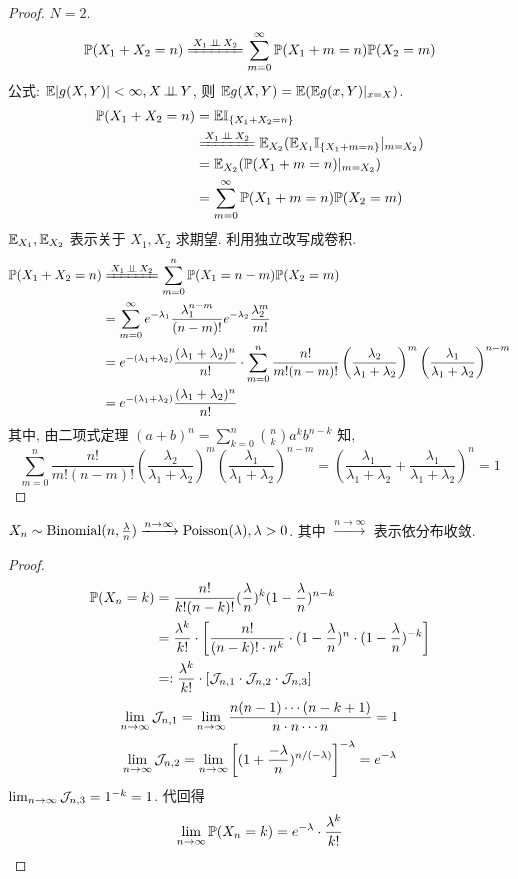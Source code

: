 \begin{proof}
    $N=2$. 
    \[
    \PP(X_1+X_2=n)\xlongequal{X_1\ind X_2}\sum_{m=0}^{\infty}\PP(X_1+m=n)\PP(X_2=m)
    \]
    公式: $\mathbb E |g(X,Y)|<\infty, X\operatorname{\perp\!\!\!\perp} Y$, 则 $\mathbb E g(X,Y)=\mathbb E(\mathbb E g(x,Y)|_{x=X})$.
    \[
    \begin{aligned}
        \PP(X_1+X_2=n) &=\EE \II_{\{X_1+X_2=n\}}\\
        &\xlongequal{X_1\ind X_2}\EE_{X_2}(\EE_{X_1} \II_{\{X_1+m=n\}}|_{m=X_2})\\
        &=\EE_{X_2}(\PP(X_1+m=n)|_{m=X_2})\\
        &=\sum_{m=0}^{\infty}\PP(X_1+m=n)\PP(X_2=m)
    \end{aligned}
    \]
    $\mathbb E_{X_1},\mathbb E_{X_2}$ 表示关于 $X_1,X_2$ 求期望. 利用独立改写成卷积.
    \[
    \begin{aligned}
        \PP(X_1+X_2=n) &\xlongequal{X_1\ind X_2} \sum_{m=0}^n \PP(X_1=n-m)\PP(X_2=m)\\
        &=\sum_{m=0}^{\infty}e^{-\lambda_1}\frac{\lambda_1^{n-m}}{(n-m)!}e^{-\lambda_2}\frac{\lambda_2^m}{m!}\\
        &=e^{-(\lambda_1+\lambda_2)}\frac{(\lambda_1+\lambda_2)^n}{n!}\cdot \sum_{m=0}^n\frac{n!}{m!(n-m)!}\left(\frac{\lambda_2}{\lambda_1+\lambda_2}\right)^m\left(\frac{\lambda_1}{\lambda_1+\lambda_2}\right)^{n-m}\\
        &=e^{-(\lambda_1+\lambda_2)}\frac{(\lambda_1+\lambda_2)^n}{n!}
    \end{aligned}
    \]
其中, 由二项式定理 $(a + b)^n = \sum_{k=0}^{n} \binom{n}{k} a^k b^{n-k}$ 知,
    \[
    \sum_{m=0}^n\frac{n!}{m!(n-m)!}\left(\frac{\lambda_2}{\lambda_1+\lambda_2}\right)^m\left(\frac{\lambda_1}{\lambda_1+\lambda_2}\right)^{n-m}=\left(\frac{\lambda_1}{\lambda_1+\lambda_2}+\frac{\lambda_1}{\lambda_1+\lambda_2}\right)^n=1
    \]
\end{proof}

\begin{theorem}
    $X_n\sim \operatorname{Binomial}(n,\frac{\lambda}{n})\xrightarrow{n\to\infty}\operatorname{Poisson}(\lambda), \lambda>0$. 其中 $\xrightarrow{n\to\infty}$ 表示依分布收敛.
\end{theorem}

\begin{proof}
\[
\begin{aligned}
    \mathbb{P}(X_n=k) &=\frac{n!}{k!(n-k)!}(\frac{\lambda}{n})^k(1-\frac{\lambda}{n})^{n-k}\\
    &=\frac{\lambda^k}{k!}\cdot \left[\frac{n!}{(n-k)!\cdot n^k}\cdot (1-\frac{\lambda}{n})^n\cdot (1-\frac{\lambda}{n})^{-k} \right]\\
    &=:\frac{\lambda^k}{k!}\cdot [\mathcal{J}_{n,1}\cdot \mathcal{J}_{n,2}\cdot \mathcal{J}_{n,3}]
\end{aligned}
\]
\[
\lim_{n\to\infty}\mathcal{J}_{n,1}=\lim_{n\to\infty}\frac{n(n-1)\cdots (n-k+1)}{n\cdot n\cdots n}=1
\]
\[
\lim_{n\to\infty}\mathcal{J}_{n,2}=\lim_{n\to\infty}\left[(1+\frac{-\lambda}{n})^{n/(-\lambda)}\right]^{-\lambda}=e^{-\lambda}
\]
$\lim_{n\to\infty}\mathcal{J}_{n,3}=1^{-k}=1$. 代回得
\[
\lim_{n\to\infty}\mathbb{P}(X_n=k)=e^{-\lambda}\cdot \frac{\lambda^k}{k!}
\]
\end{proof}
\newpage